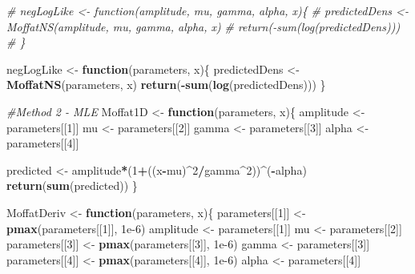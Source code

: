\documentclass[
]{article}
\newenvironment{Shaded}{\begin{snugshade}}{\end{snugshade}}
\newcommand{\CommentTok}[1]{\textcolor[rgb]{0.56,0.35,0.01}{\textit{#1}}}
\newcommand{\ControlFlowTok}[1]{\textcolor[rgb]{0.13,0.29,0.53}{\textbf{#1}}}
\newcommand{\DecValTok}[1]{\textcolor[rgb]{0.00,0.00,0.81}{#1}}
\newcommand{\FloatTok}[1]{\textcolor[rgb]{0.00,0.00,0.81}{#1}}
\newcommand{\FunctionTok}[1]{\textcolor[rgb]{0.13,0.29,0.53}{\textbf{#1}}}
\newcommand{\NormalTok}[1]{#1}
\newcommand{\OtherTok}[1]{\textcolor[rgb]{0.56,0.35,0.01}{#1}}
\newcommand{\SpecialCharTok}[1]{\textcolor[rgb]{0.81,0.36,0.00}{\textbf{#1}}}
\begin{document}
\begin{Shaded}
\begin{Highlighting}[]
\CommentTok{\# negLogLike \textless{}{-} function(amplitude, mu, gamma, alpha, x)\{}
\CommentTok{\#   predictedDens \textless{}{-} MoffatNS(amplitude, mu, gamma, alpha, x)}
\CommentTok{\#   return({-}sum(log(predictedDens)))}
\CommentTok{\# \}}

\NormalTok{negLogLike }\OtherTok{\textless{}{-}} \ControlFlowTok{function}\NormalTok{(parameters, x)\{}
\NormalTok{  predictedDens }\OtherTok{\textless{}{-}} \FunctionTok{MoffatNS}\NormalTok{(parameters, x)}
  \FunctionTok{return}\NormalTok{(}\SpecialCharTok{{-}}\FunctionTok{sum}\NormalTok{(}\FunctionTok{log}\NormalTok{(predictedDens)))}
\NormalTok{\}}
 
\CommentTok{\#Method 2 {-} MLE}
\NormalTok{Moffat1D }\OtherTok{\textless{}{-}} \ControlFlowTok{function}\NormalTok{(parameters, x)\{}
\NormalTok{  amplitude }\OtherTok{\textless{}{-}}\NormalTok{ parameters[[}\DecValTok{1}\NormalTok{]]}
\NormalTok{  mu }\OtherTok{\textless{}{-}}\NormalTok{ parameters[[}\DecValTok{2}\NormalTok{]]}
\NormalTok{  gamma }\OtherTok{\textless{}{-}}\NormalTok{ parameters[[}\DecValTok{3}\NormalTok{]]}
\NormalTok{  alpha }\OtherTok{\textless{}{-}}\NormalTok{ parameters[[}\DecValTok{4}\NormalTok{]]}
  
\NormalTok{  predicted }\OtherTok{\textless{}{-}}\NormalTok{ amplitude}\SpecialCharTok{*}\NormalTok{(}\DecValTok{1}\SpecialCharTok{+}\NormalTok{((x}\SpecialCharTok{{-}}\NormalTok{mu)}\SpecialCharTok{\^{}}\DecValTok{2}\SpecialCharTok{/}\NormalTok{gamma}\SpecialCharTok{\^{}}\DecValTok{2}\NormalTok{))}\SpecialCharTok{\^{}}\NormalTok{(}\SpecialCharTok{{-}}\NormalTok{alpha)}
  \FunctionTok{return}\NormalTok{(}\FunctionTok{sum}\NormalTok{(predicted))}
\NormalTok{\}}

\NormalTok{MoffatDeriv }\OtherTok{\textless{}{-}} \ControlFlowTok{function}\NormalTok{(parameters, x)\{}
\NormalTok{  parameters[[}\DecValTok{1}\NormalTok{]] }\OtherTok{\textless{}{-}} \FunctionTok{pmax}\NormalTok{(parameters[[}\DecValTok{1}\NormalTok{]], }\FloatTok{1e{-}6}\NormalTok{)}
\NormalTok{  amplitude }\OtherTok{\textless{}{-}}\NormalTok{ parameters[[}\DecValTok{1}\NormalTok{]]}
\NormalTok{  mu }\OtherTok{\textless{}{-}}\NormalTok{ parameters[[}\DecValTok{2}\NormalTok{]]}
\NormalTok{  parameters[[}\DecValTok{3}\NormalTok{]] }\OtherTok{\textless{}{-}} \FunctionTok{pmax}\NormalTok{(parameters[[}\DecValTok{3}\NormalTok{]], }\FloatTok{1e{-}6}\NormalTok{)}
\NormalTok{  gamma }\OtherTok{\textless{}{-}}\NormalTok{ parameters[[}\DecValTok{3}\NormalTok{]]}
\NormalTok{  parameters[[}\DecValTok{4}\NormalTok{]] }\OtherTok{\textless{}{-}} \FunctionTok{pmax}\NormalTok{(parameters[[}\DecValTok{4}\NormalTok{]], }\FloatTok{1e{-}6}\NormalTok{)}
\NormalTok{  alpha }\OtherTok{\textless{}{-}}\NormalTok{ parameters[[}\DecValTok{4}\NormalTok{]]}
  


\end{Highlighting}
\end{Shaded}
\end{document}
